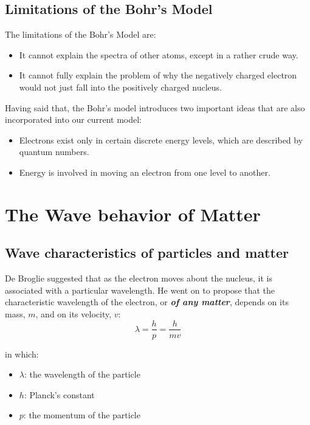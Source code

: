 \documentclass[12pt, a4paper]{report}
\newcommand{\impt}[1]{\textbf{\textit{#1}}}
\newcommand{\hi}{\section}
\newcommand{\hii}{\subsection}
\begin{document}
    \hii{Limitations of the Bohr's Model}
        \par The limitations of the Bohr's Model are:
        \begin{itemize}
            \item It cannot explain the spectra of other atoms, except in a rather crude way.
            \item It cannot fully explain the problem of why the negatively charged electron would not
                just fall into the positively charged nucleus.
        \end{itemize}
        \par Having said that, the Bohr's model introduces two important ideas that are also
        incorporated into our current model:
        \begin{itemize}
            \item Electrons exist only in certain discrete energy levels, which are described by
                quantum numbers.
            \item Energy is involved in moving an electron from one level to another.
        \end{itemize}

\hi{The Wave behavior of Matter}
    \hii{Wave characteristics of particles and matter}
        \par De Broglie suggested that as the electron moves about the nucleus, it is associated
            with a particular wavelength. He went on to propose that the characteristic
            wavelength of the electron, or \impt{of any matter}, depends on its mass, $m$,
            and on its velocity, $v$:
        \begin{equation}
            \lambda = \dfrac{h}{p} = \dfrac{h}{mv}
        \end{equation}
        \par in which:
        \begin{itemize}
            \item $\lambda$: the wavelength of the particle
            \item $h$: Planck's constant
            \item $p$: the momentum of the particle
        \end{itemize}
\end{document}
